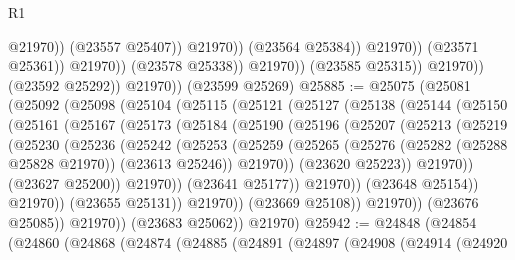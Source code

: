 \begin{lexlean}{R1}
\begin{coremodule}
                                            @21970))
                                        (@23557 @25407))
                                      @21970))
                                  (@23564 @25384))
                                @21970))
                            (@23571 @25361))
                          @21970))
                      (@23578 @25338))
                    @21970))
                (@23585 @25315))
              @21970))
          (@23592 @25292))
        @21970))
    (@23599 @25269)
@25885 := @25075
    (@25081
      (@25092
        (@25098
          (@25104
            (@25115
              (@25121
                (@25127
                  (@25138
                    (@25144
                      (@25150
                        (@25161
                          (@25167
                            (@25173
                              (@25184
                                (@25190
                                  (@25196
                                    (@25207
                                      (@25213
                                        (@25219
                                          (@25230
                                            (@25236
                                              (@25242
                                                (@25253
                                                  (@25259
                                                    (@25265
                                                      (@25276
                                                        (@25282 (@25288 @25828 @21970))
                                                        (@23613 @25246))
                                                      @21970))
                                                  (@23620 @25223))
                                                @21970))
                                            (@23627 @25200))
                                          @21970))
                                      (@23641 @25177))
                                    @21970))
                                (@23648 @25154))
                              @21970))
                          (@23655 @25131))
                        @21970))
                    (@23669 @25108))
                  @21970))
              (@23676 @25085))
            @21970))
        (@23683 @25062))
      @21970)
@25942 := @24848
    (@24854
      (@24860
        (@24868
          (@24874
            (@24885
              (@24891
                (@24897
                  (@24908
                    (@24914
                      (@24920

\end{coremodule}
\end{lexlean}
